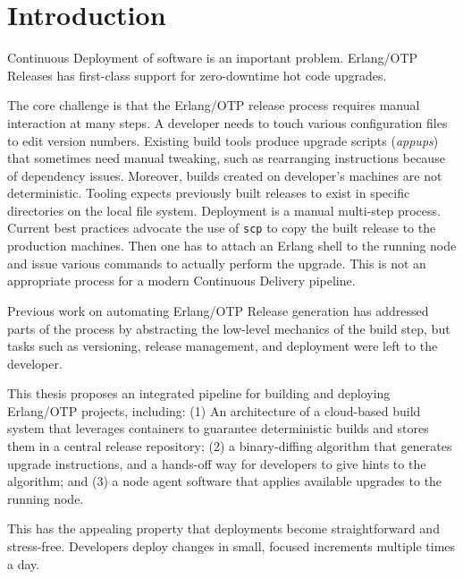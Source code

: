 \chapter{Introduction}



Continuous Deployment of software is an important problem.
Erlang/OTP Releases has first-class support for zero-downtime hot code upgrades.


The core challenge is that the Erlang/OTP release process requires manual interaction at many steps.
A developer needs to touch various configuration files to edit version numbers.
Existing build tools produce upgrade scripts (\emph{appups}) that sometimes need manual tweaking, such as rearranging instructions because of dependency issues.
Moreover, builds created on developer's machines are not deterministic. Tooling expects previously built releases to exist in specific directories on the local file system.
Deployment is a manual multi-step process. Current best practices advocate the use of \lstinline{scp} to copy the built release to the production machines. Then one has to attach an Erlang shell to the running node and issue various commands to actually perform the upgrade. This is not an appropriate process for a modern Continuous Delivery pipeline.


Previous work on automating Erlang/OTP Release generation has addressed parts of the process by abstracting the low-level mechanics of the build step, but tasks such as versioning, release management, and deployment were left to the developer.


This thesis proposes an integrated pipeline for building and deploying Erlang/OTP projects, including: (1) An architecture of a cloud-based build system that leverages containers to guarantee deterministic builds and stores them in a central release repository; (2) a binary-diffing algorithm that generates upgrade instructions, and a hands-off way for developers to give hints to the algorithm; and (3) a node agent software that applies available upgrades to the running node.


This has the appealing property that deployments become straightforward and stress-free. Developers deploy changes in small, focused increments  multiple times a day.
